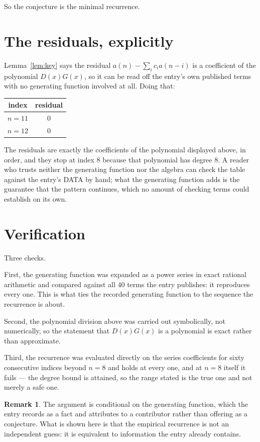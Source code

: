 \documentclass[11pt,a4paper]{article}
\theoremstyle{plain}
\theoremstyle{definition}
\newtheorem{remark}[theorem]{Remark}
\begin{document}
So the conjecture is the minimal recurrence.

\section{The residuals, explicitly}

Lemma~\ref{lem:key} says the residual $a(n)-\sum_ic_ia(n-i)$ is a coefficient of the
polynomial $D(x)G(x)$, so it can be read off the entry's own published terms with no
generating function involved at all. Doing that:
\begin{center}
\begin{tabular}{cc}
index & residual \\ \hline
$n=11$ & $0$ \\
$n=12$ & $0$
\end{tabular}
\end{center}
The residuals are exactly the coefficients of the polynomial displayed above, in order, and
they stop at index $8$ because that polynomial has degree $8$. A reader who trusts
neither the generating function nor the algebra can check the table against the entry's DATA
by hand; what the generating function adds is the guarantee that the pattern continues, which
no amount of checking terms could establish on its own.

\section{Verification}

Three checks.

First, the generating function was expanded as a power series in exact rational arithmetic and
compared against all $40$ terms the entry publishes: it reproduces every one. This is
what ties the recorded generating function to the sequence the recurrence is about.

Second, the polynomial division above was carried out symbolically, not numerically, so the
statement that $D(x)G(x)$ is a polynomial is exact rather than approximate.

Third, the recurrence was evaluated directly on the series coefficients for sixty consecutive
indices beyond $n=8$ and holds at every one, and at $n=8$ itself it fails --- the
degree bound is attained, so the range stated is the true one and not merely a safe one.

\begin{remark}
The argument is conditional on the generating function, which the entry records as a fact and
attributes to a contributor rather than offering as a conjecture. What is shown here is that
the empirical recurrence is not an independent guess: it is equivalent to information the
entry already contains.
\end{remark}
\end{document}
